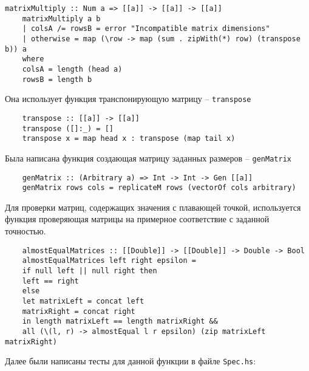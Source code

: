 \documentclass[10pt,a4paper,final]{article} %
\begin{document}
\begin{lstlisting}[caption={Функция \texttt{matrixMultiply}}]
	matrixMultiply :: Num a => [[a]] -> [[a]] -> [[a]]
	matrixMultiply a b 
	| colsA /= rowsB = error "Incompatible matrix dimensions"
	| otherwise = map (\row -> map (sum . zipWith(*) row) (transpose b)) a
	where 
	colsA = length (head a)
	rowsB = length b
\end{lstlisting}

Она использует функция транспонирующую матрицу -- \texttt{transpose}
\begin{lstlisting}
	transpose :: [[a]] -> [[a]]
	transpose ([]:_) = []
	transpose x = map head x : transpose (map tail x)
\end{lstlisting}


Была написана функция создающая матрицу заданных размеров -- \texttt{genMatrix}

\begin{lstlisting}
	genMatrix :: (Arbitrary a) => Int -> Int -> Gen [[a]]
	genMatrix rows cols = replicateM rows (vectorOf cols arbitrary)
\end{lstlisting}

	Для проверки матриц, содержащих значения с плавающей точкой, используется функция проверяющая матрицы на примерное соответствие с заданной точностью.

\begin{lstlisting}
	almostEqualMatrices :: [[Double]] -> [[Double]] -> Double -> Bool
	almostEqualMatrices left right epsilon =
	if null left || null right then
	left == right 
	else
	let matrixLeft = concat left
	matrixRight = concat right
	in length matrixLeft == length matrixRight &&
	all (\(l, r) -> almostEqual l r epsilon) (zip matrixLeft matrixRight)
\end{lstlisting}

Далее были написаны тесты для данной функции в файле \texttt{Spec.hs}:
\end{document}
